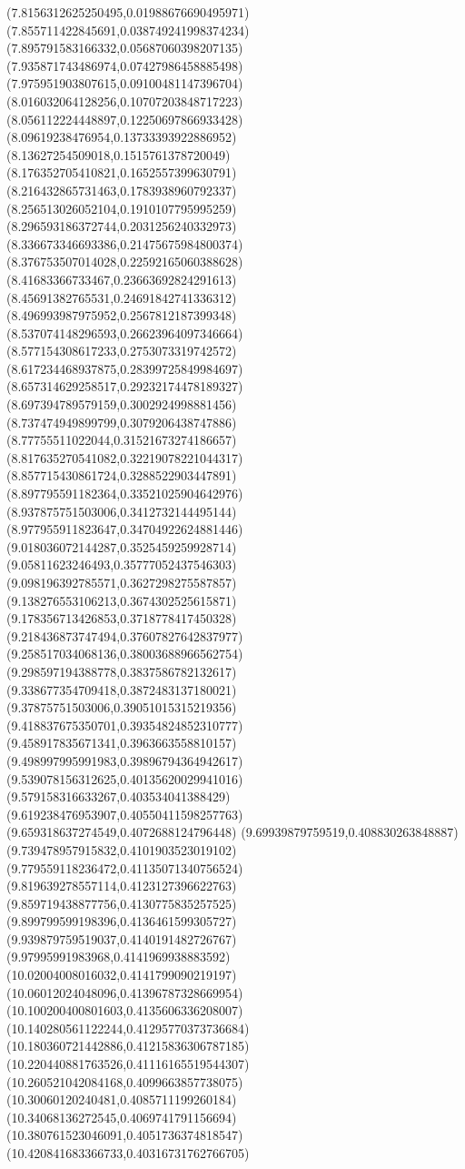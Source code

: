 {(7.8156312625250495,0.01988676690495971)
(7.855711422845691,0.038749241998374234)
(7.895791583166332,0.05687060398207135)
(7.935871743486974,0.07427986458885498)
(7.975951903807615,0.09100481147396704)
(8.016032064128256,0.10707203848717223)
(8.056112224448897,0.12250697866933428)
(8.09619238476954,0.13733393922886952)
(8.13627254509018,0.1515761378720049)
(8.176352705410821,0.1652557399630791)
(8.216432865731463,0.1783938960792337)
(8.256513026052104,0.1910107795995259)
(8.296593186372744,0.2031256240332973)
(8.336673346693386,0.21475675984800374)
(8.376753507014028,0.22592165060388628)
(8.41683366733467,0.23663692824291613)
(8.45691382765531,0.24691842741336312)
(8.496993987975952,0.2567812187399348)
(8.537074148296593,0.26623964097346664)
(8.577154308617233,0.2753073319742572)
(8.617234468937875,0.28399725849984697)
(8.657314629258517,0.29232174478189327)
(8.697394789579159,0.3002924998881456)
(8.737474949899799,0.3079206438747886)
(8.77755511022044,0.31521673274186657)
(8.817635270541082,0.32219078221044317)
(8.857715430861724,0.3288522903447891)
(8.897795591182364,0.33521025904642976)
(8.937875751503006,0.3412732144495144)
(8.977955911823647,0.34704922624881446)
(9.018036072144287,0.3525459259928714)
(9.05811623246493,0.35777052437546303)
(9.098196392785571,0.3627298275587857)
(9.138276553106213,0.3674302525615871)
(9.178356713426853,0.3718778417450328)
(9.218436873747494,0.37607827642837977)
(9.258517034068136,0.38003688966562754)
(9.298597194388778,0.3837586782132617)
(9.338677354709418,0.3872483137180021)
(9.37875751503006,0.39051015315219356)
(9.418837675350701,0.39354824852310777)
(9.458917835671341,0.3963663558810157)
(9.498997995991983,0.39896794364942617)
(9.539078156312625,0.40135620029941016)
(9.579158316633267,0.403534041388429)
(9.619238476953907,0.40550411598257763)
(9.659318637274549,0.4072688124796448)
(9.69939879759519,0.408830263848887)
(9.739478957915832,0.4101903523019102)
(9.779559118236472,0.41135071340756524)
(9.819639278557114,0.4123127396622763)
(9.859719438877756,0.4130775835257525)
(9.899799599198396,0.4136461599305727)
(9.939879759519037,0.4140191482726767)
(9.97995991983968,0.4141969938883592)
(10.02004008016032,0.4141799090219197)
(10.06012024048096,0.41396787328669954)
(10.100200400801603,0.4135606336208007)
(10.140280561122244,0.41295770373736684)
(10.180360721442886,0.41215836306787185)
(10.220440881763526,0.41116165519544307)
(10.260521042084168,0.4099663857738075)
(10.30060120240481,0.4085711199260184)
(10.34068136272545,0.4069741791156694)
(10.380761523046091,0.4051736374818547)
(10.420841683366733,0.40316731762766705)
}
